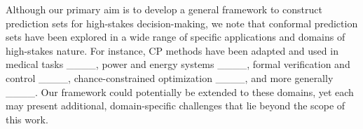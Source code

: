 Although our primary aim is to develop a general framework to construct prediction sets for  high-stakes decision-making, we note that conformal prediction sets have  been explored in a wide range of specific applications and domains of high-stakes nature. For instance, CP methods have been adapted and used in medical tasks ____, power and energy systems ____, formal verification and control ____,  chance-constrained optimization ____, and more generally ____. Our framework could potentially be extended to these domains, yet each may present additional, domain-specific challenges that lie beyond the scope of this work.








